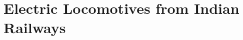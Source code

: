 \documentclass[11pt,twoside,openany,svgnames,x11names]{gkbookm1}
\begin{document}
\chapter{Electric Locomotives from Indian Railways}
\renewcommand\chapterillustration{img/IRlogo.jpg}

\newpage
%
%


\cleardoublepage
%
%
%




%
\end{document}
